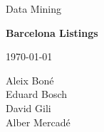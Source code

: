 

\thispagestyle{empty}
\clearpage
\setcounter{page}{-1}

\begin{titlepage}
{
    \centering
    \null
    \vfill
    {\Large Data Mining\par}
    \vspace{2em}
    {\Huge \bfseries
        \airbnb Barcelona Listings
    \par}
    \vspace{2em}
    {\large \scshape
        \today
    \par}
    \vfill
\begin{center}

\end{center}
    \vspace{3cm}

    \vfill
    {\raggedleft \large
Aleix Boné\\
Eduard Bosch\\
David Gili\\
Alber Mercadé\\
        \par}
}
\end{titlepage}
